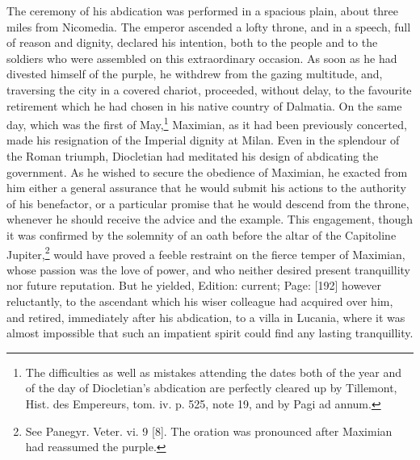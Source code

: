 The ceremony of his abdication was performed in a spacious plain, about three miles from Nicomedia. The emperor ascended a lofty throne, and in a speech, full of reason and dignity, declared his intention, both to the people and to the soldiers who were assembled on this extraordinary occasion. As soon as he had divested himself of the purple, he withdrew from the gazing multitude, and, traversing the city in a covered chariot, proceeded, without delay, to the favourite retirement which he had chosen in his native country of Dalmatia. On the same day, which was the first of May,\footnote{The difficulties as well as mistakes attending the dates both of the year and of the day of Diocletian\texthebrew{}’s abdication are perfectly cleared up by Tillemont, Hist. des Empereurs, tom. iv. p. 525, note 19, and by Pagi ad annum.} Maximian, as it had been previously concerted, made his resignation of the Imperial dignity at Milan. Even in the splendour of the Roman triumph, Diocletian had meditated his design of abdicating the government. As he wished to secure the obedience of Maximian, he exacted from him either a general assurance that he would submit his actions to the authority of his benefactor, or a particular promise that he would descend from the throne, whenever he should receive the advice and the example. This engagement, though it was confirmed by the solemnity of an oath before the altar of the Capitoline Jupiter,\footnote{See Panegyr. Veter. vi. 9 [8]. The oration was pronounced after Maximian had reassumed the purple.} would have proved a feeble restraint on the fierce temper of Maximian, whose passion was the love of power, and who neither desired present tranquillity nor future reputation. But he yielded, Edition: current; Page: [192] however reluctantly, to the ascendant which his wiser colleague had acquired over him, and retired, immediately after his abdication, to a villa in Lucania, where it was almost impossible that such an impatient spirit could find any lasting tranquillity.

